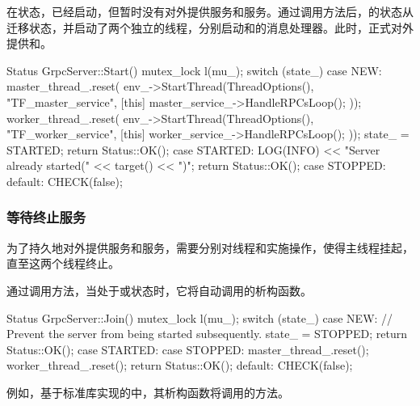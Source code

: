 \begin{content}
在状态，已经启动，但暂时没有对外提供服务和服务。通过调用方法后，的状态从迁移状态，并启动了两个独立的线程，分别启动和的消息处理器。此时，正式对外提供和。

\begin{leftbar}
\begin{c++}
Status GrpcServer::Start() {
  mutex_lock l(mu_);
  switch (state_) {
    case NEW: {
      master_thread_.reset(
          env_->StartThread(ThreadOptions(), "TF_master_service",
                            [this] { master_service_->HandleRPCsLoop(); }));
      worker_thread_.reset(
          env_->StartThread(ThreadOptions(), "TF_worker_service",
                            [this] { worker_service_->HandleRPCsLoop(); }));
      state_ = STARTED;
      return Status::OK();
    }
    case STARTED:
      LOG(INFO) << "Server already started(" << target() << ")";    
      return Status::OK();
    case STOPPED:
    default:
      CHECK(false);
  }
}
\end{c++}
\end{leftbar}

\subsubsection{等待终止服务}

为了持久地对外提供服务和服务，需要分别对线程和实施操作，使得主线程挂起，直至这两个线程终止。

通过调用方法，当处于或状态时，它将自动调用的析构函数。

\begin{leftbar}
\begin{c++}
Status GrpcServer::Join() {
  mutex_lock l(mu_);
  switch (state_) {
    case NEW:
      // Prevent the server from being started subsequently.
      state_ = STOPPED;
      return Status::OK();
    case STARTED:
    case STOPPED:
      master_thread_.reset();
      worker_thread_.reset();
      return Status::OK();
    default:
      CHECK(false);
  }
}
\end{c++}
\end{leftbar}

例如，基于标准库实现的中，其析构函数将调用的方法。


\end{content}
